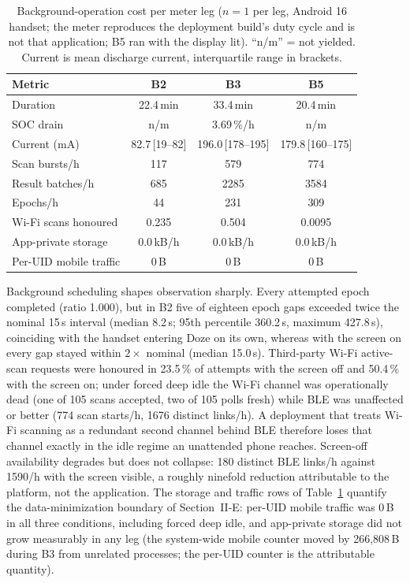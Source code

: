 \documentclass[journal,10pt]{IEEEtran}
\begin{document}
\begin{table}[htbp]
\centering
\caption{Background-operation cost per meter leg ($n = 1$ per leg, Android 16
handset; the meter reproduces the deployment build's duty cycle and is not that
application; B5 ran with the display lit). ``n/m'' = not yielded. Current is
mean discharge current, interquartile range in brackets.}
\label{tab:cost}
\footnotesize
\setlength{\tabcolsep}{3.5pt}
\begin{tabular}{@{}lccc@{}}
\toprule
\textbf{Metric} & \textbf{B2} & \textbf{B3} & \textbf{B5} \\
\midrule
Duration & 22.4\,min & 33.4\,min & 20.4\,min \\
SOC drain & n/m & 3.69\,\%/h & n/m \\
Current (mA) & 82.7\,[19--82] & 196.0\,[178--195] & 179.8\,[160--175] \\
Scan bursts/h & 117 & 579 & 774 \\
Result batches/h & 685 & 2285 & 3584 \\
Epochs/h & 44 & 231 & 309 \\
Wi-Fi scans honoured & 0.235 & 0.504 & 0.0095 \\
App-private storage & 0.0\,kB/h & 0.0\,kB/h & 0.0\,kB/h \\
Per-UID mobile traffic & 0\,B & 0\,B & 0\,B \\
\bottomrule
\end{tabular}
\end{table}

Background scheduling shapes observation sharply. Every attempted epoch
completed (ratio 1.000), but in B2 five of eighteen epoch gaps exceeded twice
the nominal 15\,s interval (median 8.2\,s; 95th percentile 360.2\,s, maximum
427.8\,s), coinciding with the handset entering Doze on its own, whereas with
the screen on every gap stayed within $2\times$ nominal (median 15.0\,s).
Third-party Wi-Fi active-scan requests were honoured in 23.5\,\% of attempts
with the screen off and 50.4\,\% with the screen on; under forced deep idle the
Wi-Fi channel was operationally dead (one of 105 scans accepted, two of 105
polls fresh) while BLE was unaffected or better (774 scan starts/h, 1676
distinct links/h). A deployment that treats Wi-Fi scanning as a redundant
second channel behind BLE therefore loses that channel exactly in the idle
regime an unattended phone reaches. Screen-off availability degrades but does
not collapse: 180 distinct BLE links/h against 1590/h with the screen visible,
a roughly ninefold reduction attributable to the platform, not the
application. The storage and traffic rows of Table~\ref{tab:cost} quantify the
data-minimization boundary of Section~II-E: per-UID mobile traffic was 0\,B in
all three conditions, including forced deep idle, and app-private storage did
not grow measurably in any leg (the system-wide mobile counter moved by
266{,}808\,B during B3 from unrelated processes; the per-UID counter is the
attributable quantity).
\end{document}
